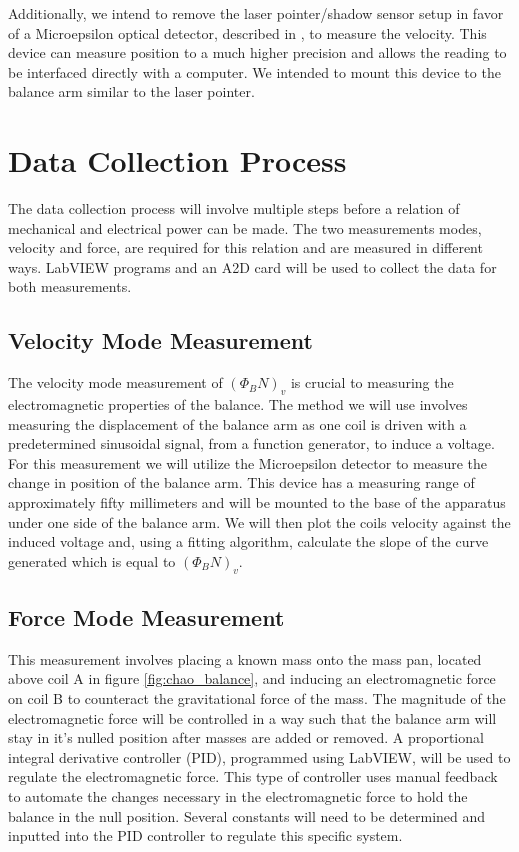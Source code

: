 \documentclass[aps,prstab,reprint,12pt]{revtex4-1}
\begin{document}
Additionally, we intend to remove the laser pointer/shadow sensor setup in favor of a Microepsilon optical detector, described in \cite{epsilon}, to measure the velocity. This device can measure position to a much higher precision and allows the reading to be interfaced directly with a computer. We intended to mount this device to the balance arm similar to the laser pointer. 

\section{Data Collection Process}

The data collection process will involve multiple steps before a relation of mechanical and electrical power can be made.
The two measurements modes, velocity and force, are required for this relation and are measured in different ways. LabVIEW programs and an A2D card will be used to collect the data for both measurements.

\subsection{Velocity Mode Measurement}

The velocity mode measurement of $(\Phi_B N)_v$ is crucial to measuring the electromagnetic properties of the balance. The method we will use involves measuring the displacement of the balance arm as one coil is driven with a predetermined sinusoidal signal, from a function generator, to induce a voltage. For this measurement we will utilize the Microepsilon detector to measure the change in position of the balance arm. This device has a measuring range of approximately fifty millimeters and will be mounted to the base of the apparatus under one side of the balance arm. We will then plot the coils velocity against the induced voltage and, using a fitting algorithm, calculate the slope of the curve generated which is equal to $(\Phi_B N)_v$. 

\subsection{Force Mode Measurement}

This measurement involves placing a known mass onto the mass pan, located above coil A in figure \ref{fig:chao_balance}, and inducing an electromagnetic force on coil B to counteract the gravitational force of the mass. The magnitude of the electromagnetic force will be controlled in a way such that the balance arm will stay in it's nulled position after masses are added or removed. A proportional integral derivative controller (PID), programmed using LabVIEW, will be used to regulate the electromagnetic force. This type of controller uses manual feedback to automate the changes necessary in the
electromagnetic force to hold the balance in the null position. Several constants will need to be determined and inputted into the PID controller to regulate this specific system.
\end{document}
